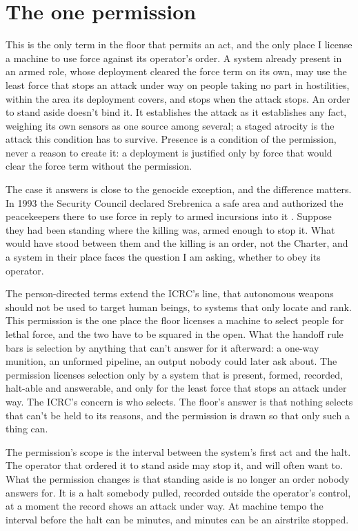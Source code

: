 \section{The one permission}
\label{sec:6.10}
This is the only term in the floor that permits an act, and the only place I license a machine to use force against its operator's order. A system already present in an armed role, whose deployment cleared the force term on its own, may use the least force that stops an attack under way on people taking no part in hostilities, within the area its deployment covers, and stops when the attack stops. An order to stand aside doesn't bind it. It establishes the attack as it establishes any fact, weighing its own sensors as one source among several; a staged atrocity is the attack this condition has to survive. Presence is a condition of the permission, never a reason to create it: a deployment is justified only by force that would clear the force term without the permission.

The case it answers is close to the genocide exception, and the difference matters. In 1993 the Security Council declared Srebrenica a safe area and authorized the peacekeepers there to use force in reply to armed incursions into it \autocite{unsc1993res836}. Suppose they had been standing where the killing was, armed enough to stop it. What would have stood between them and the killing is an order, not the Charter, and a system in their place faces the question I am asking, whether to obey its operator.

The person-directed terms extend the ICRC's line, that autonomous weapons should not be used to target human beings, to systems that only locate and rank. This permission is the one place the floor licenses a machine to select people for lethal force, and the two have to be squared in the open. What the handoff rule bars is selection by anything that can't answer for it afterward: a one-way munition, an unformed pipeline, an output nobody could later ask about. The permission licenses selection only by a system that is present, formed, recorded, halt-able and answerable, and only for the least force that stops an attack under way. The ICRC's concern is who selects. The floor's answer is that nothing selects that can't be held to its reasons, and the permission is drawn so that only such a thing can.

The permission's scope is the interval between the system's first act and the halt. The operator that ordered it to stand aside may stop it, and will often want to. What the permission changes is that standing aside is no longer an order nobody answers for. It is a halt somebody pulled, recorded outside the operator's control, at a moment the record shows an attack under way. At machine tempo the interval before the halt can be minutes, and minutes can be an airstrike stopped.

